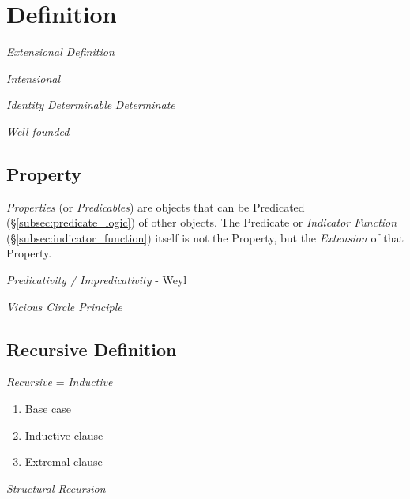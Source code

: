 \documentclass{article}
\begin{document}
\section{Definition}\label{sec:set_definition}

\emph{Extensional Definition}

\emph{Intensional}

\emph{Identity} \emph{Determinable} \emph{Determinate}

\emph{Well-founded}

\subsection{Property}\label{subsec:set_property}

\emph{Properties} (or \emph{Predicables}) are objects that can be
Predicated (\S\ref{subsec:predicate_logic}) of other objects. The
Predicate or \emph{Indicator Function}
(\S\ref{subsec:indicator_function}) itself is not the Property, but
the \emph{Extension} of that Property.

\emph{Predicativity / Impredicativity} - Weyl

\emph{Vicious Circle Principle}



\subsection{Recursive Definition}\label{subsec:recursive_definition}

\emph{Recursive} = \emph{Inductive}

\begin{enumerate}
    \item Base case
    \item Inductive clause
    \item Extremal clause
\end{enumerate}

\emph{Structural Recursion}



\end{document}
